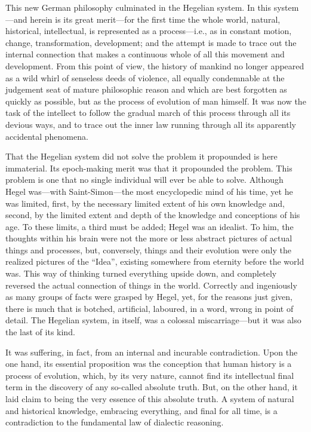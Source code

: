This new German philosophy culminated in the Hegelian system. In this
system---and herein is its great merit---for the first time the whole world,
natural, historical, intellectual, is represented as a process---i.e., as in
constant motion, change, transformation, development; and the attempt is made to
trace out the internal connection that makes a continuous whole of all this
movement and development. From this point of view, the history of mankind no
longer appeared as a wild whirl of senseless deeds of violence, all equally
condemnable at the judgement seat of mature philosophic reason and which are best
forgotten as quickly as possible, but as the process of evolution of man
himself. It was now the task of the intellect to follow the gradual march of
this process through all its devious ways, and to trace out the inner law running
through all its apparently accidental phenomena.

That the Hegelian system did not solve the problem it propounded is here
immaterial. Its epoch-making merit was that it propounded the problem. This
problem is one that no single individual will ever be able to solve. Although
Hegel was---with Saint-Simon---the most encyclopedic mind of his time, yet he
was limited, first, by the necessary limited extent of his own knowledge and,
second, by the limited extent and depth of the knowledge and conceptions of his
age. To these limits, a third must be added; Hegel was an idealist. To him, the
thoughts within his brain were not the more or less abstract pictures of actual
things and processes, but, conversely, things and their evolution were only the
realized pictures of the ``Idea'', existing somewhere from eternity before the
world was. This way of thinking turned everything upside down, and completely
reversed the actual connection of things in the world. Correctly and ingeniously
as many groups of facts were grasped by Hegel, yet, for the reasons just given,
there is much that is botched, artificial, laboured, in a word, wrong in point
of detail. The Hegelian system, in itself, was a colossal miscarriage---but it
was also the last of its kind.

It was suffering, in fact, from an internal and incurable contradiction. Upon
the one hand, its essential proposition was the conception that human history is
a process of evolution, which, by its very nature, cannot find its intellectual
final term in the discovery of any so-called absolute truth. But, on the other
hand, it laid claim to being the very essence of this absolute truth. A system
of natural and historical knowledge, embracing everything, and final for all
time, is a contradiction to the fundamental law of dialectic reasoning.

